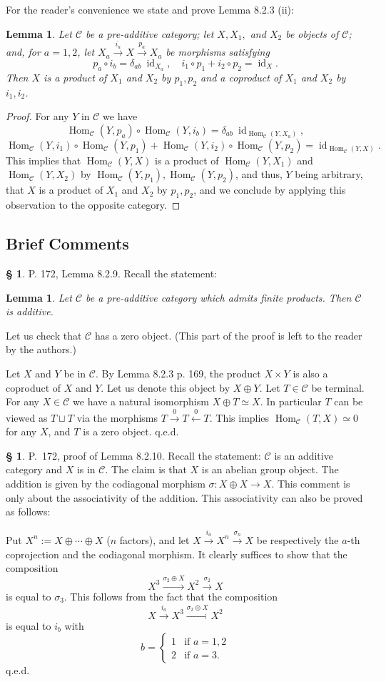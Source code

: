 \documentclass[12pt]{article}
\newtheorem{lem}[thm]{Lemma}
\theoremstyle{remark}
\theoremstyle{definition}
\newtheorem{s}[thm]{\S}
\newcommand{\C}{\mathcal C}
\newcommand{\bc}{\subsection{Brief Comments}}
\newcommand{\xl}{\xleftarrow}
\newcommand{\xr}{\xrightarrow}
\DeclareMathOperator{\id}{id}
\DeclareMathOperator{\Hom}{Hom}%
\begin{document}
For the reader's convenience we state and prove Lemma 8.2.3 (ii):
%
\begin{lem}\label{823ii}
Let $\C$ be a pre-additive category; let $X,X_1,$ and $X_2$ be objects of $\C$; and, for $a=1,2$, let $X_a\xr{i_a}X\xr{p_a}X_a$ be morphisms satisfying 
$$
p_a\circ i_b=\delta_{ab}\ \id_{X_a},\quad i_1\circ p_1+i_2\circ p_2=\id_X.
$$
Then $X$ is a product of $X_1$ and $X_2$ by $p_1,p_2$ and a coproduct of $X_1$ and $X_2$ by $i_1,i_2$. 
\end{lem}
%
\begin{proof}
For any $Y$ in $\C$ we have 
$$
\Hom_\C(Y,p_a)\circ\Hom_\C(Y,i_b)=\delta_{ab}\ \id_{\Hom_\C(Y,X_a)},
$$ 
$$
\Hom_\C(Y,i_1)\circ\Hom_\C(Y,p_1)+\Hom_\C(Y,i_2)\circ\Hom_\C(Y,p_2)=\id_{\Hom_\C(Y,X)}.
$$ 
This implies that $\Hom_\C(Y,X)$ is a product of $\Hom_\C(Y,X_1)$ and $\Hom_\C(Y,X_2)$ by $\Hom_\C(Y,p_1),\Hom_\C(Y,p_2)$, and thus, $Y$ being arbitrary, that $X$ is a product of $X_1$ and $X_2$ by $p_1,p_2$, and we conclude by applying this observation to the opposite category.
\end{proof}
%
%
\bc
%
%
\begin{s} 
P. 172, Lemma 8.2.9. Recall the statement:
%
\begin{lem}
Let $\C$ be a pre-additive category which admits finite products. Then $\C$ is additive.
\end{lem}
%
Let us check that $\C$ has a zero object. (This part of the proof is left to the reader by the authors.) 

Let $X$ and $Y$ be in $\C$. By Lemma 8.2.3 p. 169, the product $X\times Y$ is also a coproduct of $X$ and $Y$. Let us denote this object by $X\oplus Y$. Let $T\in\C$ be terminal. For any $X\in\C$ we have a natural isomorphism $X\oplus T\simeq X$. In particular $T$ can be viewed as $T\sqcup T$ via the morphisms $T\xr0T\xl0T$. This implies $\Hom_\C(T,X)\simeq0$ for any $X$, and $T$ is a zero object. q.e.d.
\end{s}
%
%
\begin{s} 
P.~172, proof of Lemma 8.2.10. Recall the statement: $\C$ is an additive category and $X$ is in $\C$. The claim is that $X$ is an abelian group object. The addition is given by the codiagonal morphism $\sigma:X\oplus X\to X$. This comment is only about the associativity of the addition. This associativity can also be proved as follows:

Put $X^n:=X\oplus\cdots\oplus X$ ($n$ factors), and let $X\xr{i_a}X^n\xr{\sigma_n}X$ be respectively the $a$-th coprojection and the codiagonal morphism. It clearly suffices to show that the composition 
$$
X^3\xr{\sigma_2\oplus X}X^2\xr{\sigma_2}X
$$ 
is equal to $\sigma_3$. This follows from the fact that the composition 
$$
X\xr{i_a}X^3\xr{\sigma_2\oplus X}X^2
$$ 
is equal to $i_b$ with 
$$
b=\begin{cases}1&\text{if }a=1,2\\2&\text{if }a=3.\end{cases}
$$ 
q.e.d.
\end{s}
\end{document}
